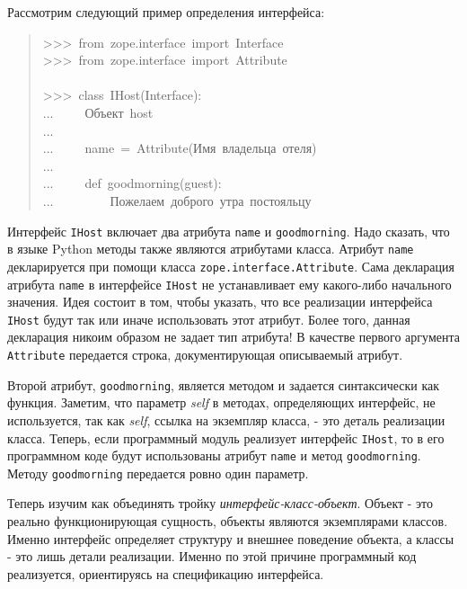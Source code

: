 \documentclass[14pt,a4paper,openany,twoside,final]{extbook}
\providecommand*{\DUroletitlereference}[1]{\textsl{#1}}
\begin{document}
Рассмотрим следующий пример определения интерфейса:

\begin{quote}{\ttfamily \raggedright \noindent
>{}>{}>~from~zope.interface~import~Interface\\
>{}>{}>~from~zope.interface~import~Attribute\\
~\\
>{}>{}>~class~IHost(Interface):\\
...~~~~~\textquotedbl{}\textquotedbl{}\textquotedbl{}Объект~host\textquotedbl{}\textquotedbl{}\textquotedbl{}\\
...\\
...~~~~~name~=~Attribute(\textquotedbl{}\textquotedbl{}\textquotedbl{}Имя~владельца~отеля\textquotedbl{}\textquotedbl{}\textquotedbl{})\\
...\\
...~~~~~def~goodmorning(guest):\\
...~~~~~~~~~\textquotedbl{}\textquotedbl{}\textquotedbl{}Пожелаем~доброго~утра~постояльцу\textquotedbl{}\textquotedbl{}\textquotedbl{}
}
\end{quote}

Интерфейс \texttt{IHost} включает два атрибута \texttt{name} и \texttt{goodmorning}.
Надо сказать, что в языке Python методы также являются атрибутами
класса.  Атрибут \texttt{name} декларируется при помощи класса
\texttt{zope.interface.Attribute}.  Сама декларация атрибута \texttt{name} в
интерфейсе \texttt{IHost} не устанавливает ему какого-либо начального
значения.  Идея состоит в том, чтобы указать, что все реализации
интерфейса \texttt{IHost} будут так или иначе использовать этот атрибут.
Более того, данная декларация никоим образом не задает тип атрибута!
В качестве первого аргумента \texttt{Attribute} передается строка,
документирующая описываемый атрибут.

Второй атрибут, \texttt{goodmorning}, является методом и задается
синтаксически как функция.  Заметим, что параметр \DUroletitlereference{self} в методах,
определяющих интерфейс, не используется, так как \DUroletitlereference{self}, ссылка на
экземпляр класса, - это деталь реализации класса.  Теперь, если
программный модуль реализует интерфейс \texttt{IHost}, то в его программном
коде будут использованы атрибут \texttt{name} и метод \texttt{goodmorning}.
Методу \texttt{goodmorning} передается ровно один параметр.

Теперь изучим как объединять тройку \DUroletitlereference{интерфейс-класс-объект}.  Объект
- это реально функционирующая сущность, объекты являются экземплярами
классов.  Именно интерфейс определяет структуру и внешнее поведение
объекта, а классы - это лишь детали реализации.  Именно по этой
причине программный код реализуется, ориентируясь на спецификацию
интерфейса.
\end{document}
